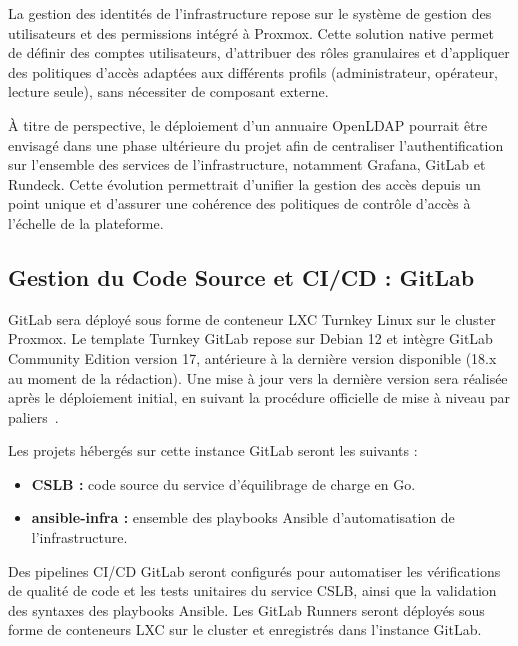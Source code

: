 \par La gestion des identités de l'infrastructure repose sur le système de gestion des utilisateurs et des permissions intégré à Proxmox. Cette solution native permet de définir des comptes utilisateurs, d'attribuer des rôles granulaires et d'appliquer des politiques d'accès adaptées aux différents profils (administrateur, opérateur, lecture seule), sans nécessiter de composant externe.

\par À titre de perspective, le déploiement d'un annuaire OpenLDAP pourrait être envisagé dans une phase ultérieure du projet afin de centraliser l'authentification sur l'ensemble des services de l'infrastructure, notamment Grafana, GitLab et Rundeck. Cette évolution permettrait d'unifier la gestion des accès depuis un point unique et d'assurer une cohérence des politiques de contrôle d'accès à l'échelle de la plateforme.

\subsection{Gestion du Code Source et CI/CD : GitLab}

\par GitLab sera déployé sous forme de conteneur LXC Turnkey Linux sur le cluster Proxmox. Le template Turnkey GitLab repose sur Debian 12 et intègre GitLab Community Edition version 17, antérieure à la dernière version disponible (18.x au moment de la rédaction). Une mise à jour vers la dernière version sera réalisée après le déploiement initial, en suivant la procédure officielle de mise à niveau par paliers~\cite{ref40}.

\par Les projets hébergés sur cette instance GitLab seront les suivants :\\

\begin{itemize}
    \item \textbf{CSLB :} code source du service d'équilibrage de charge en Go.
    \item \textbf{ansible-infra :} ensemble des playbooks Ansible d'automatisation de l'infrastructure.
\end{itemize}

\par Des pipelines CI/CD GitLab seront configurés pour automatiser les vérifications de qualité de code et les tests unitaires du service CSLB, ainsi que la validation des syntaxes des playbooks Ansible. Les GitLab Runners seront déployés sous forme de conteneurs LXC sur le cluster et enregistrés dans l'instance GitLab.


